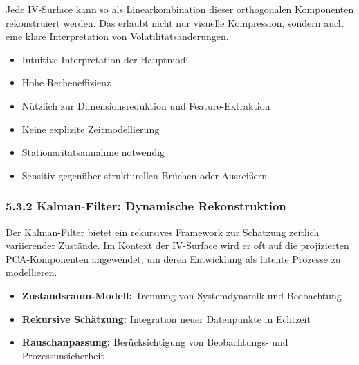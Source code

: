 \documentclass[a4paper,12pt]{article}
\begin{document}
Jede IV-Surface kann so als Linearkombination dieser orthogonalen Komponenten rekonstruiert werden. Das erlaubt nicht nur visuelle Kompression, sondern auch eine klare Interpretation von Volatilitätsänderungen.\\



\noindent
\begin{minipage}[t]{0.48\textwidth}
\begin{tcolorbox}[colback=blue!5!white, colframe=blue!75!black, title=Vorteile]
\begin{itemize}
  \item Intuitive Interpretation der Hauptmodi
  \item Hohe Recheneffizienz
  \item Nützlich zur Dimensionsreduktion und Feature-Extraktion
\end{itemize}
\end{tcolorbox}
\end{minipage}
\hfill
\begin{minipage}[t]{0.48\textwidth}
\begin{tcolorbox}[colback=red!5!white, colframe=red!75!black, title=Grenzen]
\begin{itemize}
  \item Keine explizite Zeitmodellierung
  \item Stationaritätsannahme notwendig
  \item Sensitiv gegenüber strukturellen Brüchen oder Ausreißern
\end{itemize}
\end{tcolorbox}
\end{minipage}

\subsubsection*{5.3.2 Kalman-Filter: Dynamische Rekonstruktion}

Der Kalman-Filter bietet ein rekursives Framework zur Schätzung zeitlich variierender Zustände. Im Kontext der IV-Surface wird er oft auf die projizierten PCA-Komponenten angewendet, um deren Entwicklung als latente Prozesse zu modellieren.

\begin{itemize}
  \item \textbf{Zustandsraum-Modell:} Trennung von Systemdynamik und Beobachtung
  \item \textbf{Rekursive Schätzung:} Integration neuer Datenpunkte in Echtzeit
  \item \textbf{Rauschanpassung:} Berücksichtigung von Beobachtungs- und Prozessunsicherheit
\end{itemize}
\end{document}
